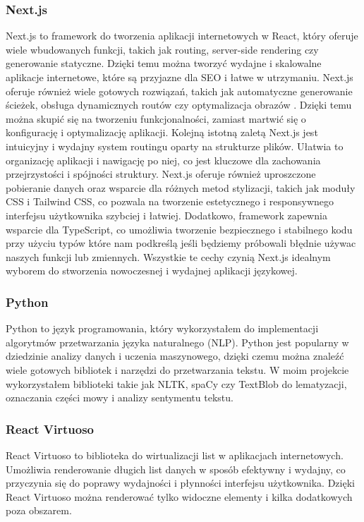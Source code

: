 \subsubsection{Next.js}
Next.js to framework do tworzenia aplikacji internetowych w React, który oferuje wiele wbudowanych funkcji, takich jak routing, server-side rendering czy generowanie statyczne. Dzięki temu można tworzyć wydajne i skalowalne aplikacje internetowe, które są przyjazne dla SEO i łatwe w utrzymaniu. Next.js oferuje również wiele gotowych rozwiązań, takich jak automatyczne generowanie ścieżek, obsługa dynamicznych routów czy optymalizacja obrazów \cite{nextjs}. Dzięki temu można skupić się na tworzeniu funkcjonalności, zamiast martwić się o konfigurację i optymalizację aplikacji.
Kolejną istotną zaletą Next.js jest intuicyjny i wydajny system routingu oparty na strukturze plików. Ułatwia to organizację aplikacji i nawigację po niej, co jest kluczowe dla zachowania przejrzystości i spójności struktury. Next.js oferuje również uproszczone pobieranie danych oraz wsparcie dla różnych metod stylizacji, takich jak moduły CSS i Tailwind CSS, co pozwala na tworzenie estetycznego i responsywnego interfejsu użytkownika szybciej i łatwiej. Dodatkowo, framework zapewnia wsparcie dla TypeScript, co umożliwia tworzenie bezpiecznego i stabilnego kodu przy użyciu typów które nam podkreślą jeśli będziemy próbowali błędnie używac naszych funkcji lub zmiennych. Wszystkie te cechy czynią Next.js idealnym wyborem do stworzenia nowoczesnej i wydajnej aplikacji językowej.

\subsubsection{Python}
Python to język programowania, który wykorzystałem do implementacji algorytmów przetwarzania języka naturalnego (NLP). Python jest popularny w dziedzinie analizy danych i uczenia maszynowego, dzięki czemu można znaleźć wiele gotowych bibliotek i narzędzi do przetwarzania tekstu. W moim projekcie wykorzystałem biblioteki takie jak NLTK, spaCy czy TextBlob do lematyzacji, oznaczania części mowy i analizy sentymentu tekstu.

\subsubsection{React Virtuoso}
React Virtuoso to biblioteka do wirtualizacji list w aplikacjach internetowych. Umożliwia renderowanie długich list danych w sposób efektywny i wydajny, co przyczynia się do poprawy wydajności i płynności interfejsu użytkownika. Dzięki React Virtuoso można renderować tylko widoczne elementy i kilka dodatkowych poza obszarem.

